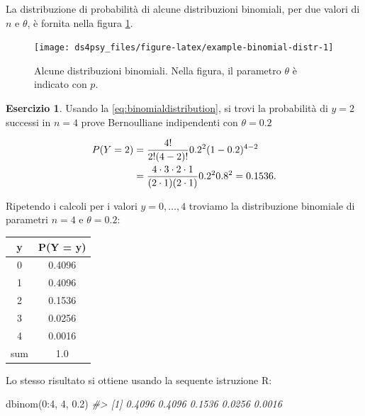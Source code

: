 \documentclass[
  11pt,
]{krantz}
\makeatletter
\newenvironment{Shaded}{\begin{snugshade}}{\end{snugshade}}
\newcommand{\CommentTok}[1]{\textcolor[rgb]{0.37,0.37,0.37}{\textit{#1}}}
\newcommand{\DecValTok}[1]{\textcolor[rgb]{0.06,0.06,0.06}{#1}}
\newcommand{\FloatTok}[1]{\textcolor[rgb]{0.06,0.06,0.06}{#1}}
\newcommand{\FunctionTok}[1]{\textcolor[rgb]{0,0,0}{#1}}
\newcommand{\NormalTok}[1]{#1}
\newcommand{\SpecialCharTok}[1]{\textcolor[rgb]{0,0,0}{#1}}
\newenvironment{kframe}{%
\medskip{}
\setlength{\fboxsep}{.8em}
 \def\at@end@of@kframe{}%
 \ifinner\ifhmode%
  \def\at@end@of@kframe{\end{minipage}}%
  \begin{minipage}{\columnwidth}%
 \fi\fi%
 \def\FrameCommand##1{\hskip\@totalleftmargin \hskip-\fboxsep
 \colorbox{shadecolor}{##1}\hskip-\fboxsep
     \hskip-\linewidth \hskip-\@totalleftmargin \hskip\columnwidth}%
 \MakeFramed {\advance\hsize-\width
   \@totalleftmargin\z@ \linewidth\hsize
   \@setminipage}}%
 {\par\unskip\endMakeFramed%
 \at@end@of@kframe}
\renewenvironment{Shaded}{\begin{kframe}}{\end{kframe}}
\newcommand{\R}{\textsf{R}} %
\theoremstyle{definition}
\theoremstyle{definition}
\theoremstyle{definition}
\newtheorem{exercise}{Esercizio}[chapter]
\theoremstyle{definition}
\theoremstyle{remark}
\makeatother
\begin{document}
La distribuzione di probabilità di alcune distribuzioni binomiali, per due valori di \(n\) e \(\theta\), è fornita nella figura \ref{fig:example-binomial-distr}.

\begin{figure}[h]

{\centering \texttt{[image: ds4psy\_files/figure-latex/example-binomial-distr-1]} 

}

\caption{Alcune distribuzioni binomiali. Nella figura, il parametro $\theta$ è indicato con $p$.}\label{fig:example-binomial-distr}
\end{figure}

\begin{exercise}

Usando la \eqref{eq:binomialdistribution}, si trovi la probabilità di \(y = 2\) successi in \(n = 4\) prove Bernoulliane indipendenti con \(\theta = 0.2\)

\[
\begin{aligned}
P(Y=2) &= \frac{4!}{2!(4-2)!} 0.2^{2} (1-0.2)^{4-2} \notag  \\
 &= \frac{4 \cdot 3 \cdot 2 \cdot 1}{(2 \cdot 1)(2 \cdot 1)}
0.2^{2} 0.8^{2} = 0.1536. \notag
\end{aligned}
\]

Ripetendo i calcoli per i valori \(y = 0, \dots, 4\) troviamo la distribuzione binomiale di parametri \(n = 4\) e \(\theta = 0.2\):

\begin{longtable}[]{@{}cc@{}}
\toprule
y & P(Y = y) \\
\midrule
\endhead
0 & 0.4096 \\
1 & 0.4096 \\
2 & 0.1536 \\
3 & 0.0256 \\
4 & 0.0016 \\
sum & 1.0 \\
\bottomrule
\end{longtable}

Lo stesso risultato si ottiene usando la sequente istruzione \R:

\begin{Shaded}
\begin{Highlighting}[]
\FunctionTok{dbinom}\NormalTok{(}\DecValTok{0}\SpecialCharTok{:}\DecValTok{4}\NormalTok{, }\DecValTok{4}\NormalTok{, }\FloatTok{0.2}\NormalTok{)}
\CommentTok{\#\textgreater{} [1] 0.4096 0.4096 0.1536 0.0256 0.0016}
\end{Highlighting}
\end{Shaded}

\end{exercise}
\end{document}
